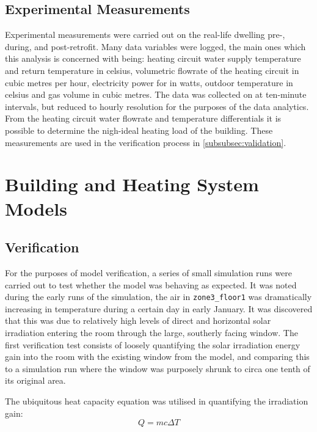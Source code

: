 \subsection{Experimental Measurements}
Experimental measurements were carried out on the real-life dwelling pre-, during, and post-retrofit. Many data variables were logged, the main ones which this analysis is concerned with being: heating circuit water supply temperature and return temperature in celsius, volumetric flowrate of the heating circuit in cubic metres per hour, electricity power for \HP in watts, outdoor temperature in celsius and gas volume in cubic metres. The data was collected on at ten-minute intervals, but reduced to hourly resolution for the purposes of the data analytics. From the heating circuit water flowrate and temperature differentials it is possible to determine the nigh-ideal heating load of the building. These measurements are used in the verification process in \cref{subsubsec:validation}.


\section{Building and Heating System Models}



\subsection{Verification} \label{subsubsec:verification}
For the purposes of model verification, a series of small simulation runs were carried out to test whether the model was behaving as expected. It was noted during the early runs of the simulation, the air in \texttt{zone3\_floor1} was dramatically increasing in temperature during a certain day in early January. It was discovered that this was due to relatively high levels of direct and horizontal solar irradiation entering the room through the large, southerly facing window. The first verification test consists of loosely quantifying the solar irradiation energy gain into the room with the existing window from the model, and comparing this to a simulation run where the window was purposely shrunk to circa one tenth of its original area. 

The ubiquitous heat capacity equation was utilised in quantifying the irradiation gain: 
\begin{equation}
    Q = mc\Delta T 
\end{equation} 

